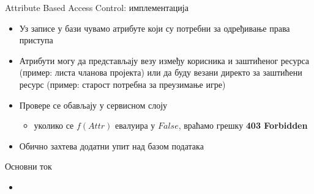 \documentclass{beamer}
\begin{document}
    \begin{frame}{Attribute Based Access Control: имплементација}
        \begin{itemize}
            \item Уз записе у бази чувамо атрибуте који су потребни за одређивање права приступа
            \item Атрибути могу да представљају везу између корисника и заштићеног ресурса (пример: листа чланова пројекта) или да буду везани директо за заштићени ресурс (пример: старост потребна за преузимање игре)
            \item Провере се обављају у сервисном слоју
            \begin{itemize}
                \item уколико се \begin{math}f(Attr)\end{math} евалуира у \begin{math}False\end{math}, враћамо грешку \textbf{403 Forbidden}
            \end{itemize}
            \item Обично захтева додатни упит над базом података
        \end{itemize}
    \end{frame}
    
    \begin{frame}{Основни ток}
        \begin{itemize}
            \item 
        \end{itemize}
    \end{frame}
    
\end{document}
